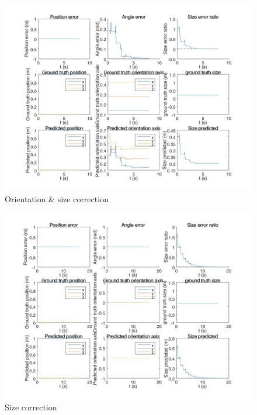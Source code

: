 \begin{figure}
  \includegraphics[width=1.2\textwidth,trim = 0mm 0mm 0mm 0mm,clip]{./Figures/observer_error_stationary_orientation_size.jpg}
  \caption{Orientation \& size correction}
\end{figure}

\begin{figure}
  \includegraphics[width=1.2\textwidth,trim = 0mm 0mm 0mm 0mm,clip]{./Figures/observer_error_stationary_size.jpg}
  \caption{Size correction}
\end{figure}

